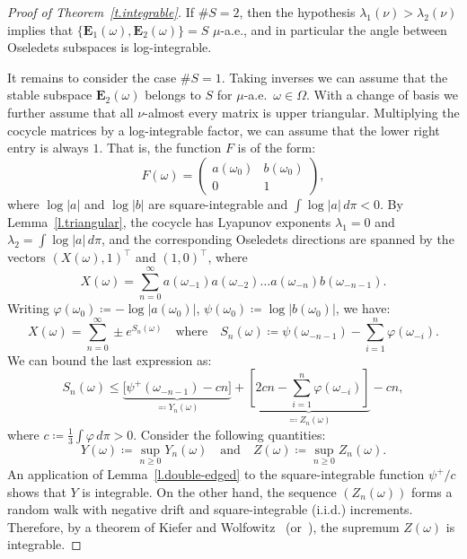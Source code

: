 \documentclass[10pt]{amsart}
\theoremstyle{definition}\newtheorem{defi}[theo]{Definition}\newtheorem{rema}[theo]{Remark}\newtheorem{exam}[theo]{Example}\newtheorem{exem}[theo]{Example}\newtheorem{nota}[theo]{Notation}
\newcommand{\smallplus}{+}\newcommand{\smallminus}{-}\newcommand{\smalltimes}{\times}\newcommand{\smallpm}{\pm}\newcommand{\smallmp}{\mp}
\newcommand{\E}{\mathbf{E}}
\renewcommand{\phi}{\varphi}
\begin{document}
\begin{proof}[Proof of Theorem~\ref{t.integrable}]
If $\# S = 2$, then the hypothesis $\lambda_1(\nu) > \lambda_2(\nu)$ implies that $\{ \E_1(\omega), \E_2(\omega)\} = S$ $\mu$-a.e., and in particular the angle between Oseledets subspaces is log-integrable.

It remains to consider the case $\# S = 1$. Taking inverses we can assume that the stable subspace $\E_2(\omega)$ belongs to $S$ for $\mu$-a.e.~$\omega \in \Omega$. With a change of basis we further assume that all $\nu$-almost every matrix is upper triangular. Multiplying the cocycle matrices by a log-integrable factor, we can assume that the lower right entry is always $1$. That is, the function $F$ is of the form:
\begin{equation}
F(\omega) =
\begin{pmatrix}
a(\omega_0) & b(\omega_0) \\ 0 & 1
\end{pmatrix} ,
\end{equation}
where $\log|a|$ and $\log|b|$ are square-integrable and $\int \log |a| \, d\pi < 0$. By Lemma~\ref{l.triangular}, the cocycle has Lyapunov exponents $\lambda_1 = 0$ and $\lambda_2 = \int \log |a| \, d\pi$, and the corresponding Oseledets directions are spanned by the vectors $(X(\omega),1)^\top$ and $(1,0)^\top$, where
\begin{equation}
X(\omega) = \sum_{n=0}^\infty a(\omega_{-1}) a(\omega_{-2}) \dots a(\omega_{-n}) b(\omega_{-n-1}).
\end{equation}
Writing $\phi(\omega_0) \coloneqq - \log |a(\omega_0)|$, $\psi(\omega_0) \coloneqq \log |b(\omega_0)|$, we have:
\begin{equation}
X(\omega) = \sum_{n=0}^\infty \pm e^{S_n(\omega)} \quad \text{where} \quad S_n(\omega) \coloneqq \psi(\omega_{-n-1}) - \sum_{i=1}^n \phi(\omega_{-i}).
\end{equation}
We can bound the last expression as:
\begin{equation}
S_n(\omega) \le
\underbrace{\Big[\psi^{\smallplus}(\omega_{-n-1}) -cn \Big]}_{\eqcolon Y_n(\omega)} +
\underbrace{\left[2cn - {\sum_{i=1}^n \phi(\omega_{-i}) } \right]}_{\eqcolon Z_n(\omega)} -cn,
\end{equation}
where $c \coloneqq \frac{1}{3} \int \phi \, d\pi > 0$. Consider the following quantities:
\begin{equation}
Y(\omega) \coloneqq \sup_{n \ge 0} Y_n(\omega) \quad \text{and} \quad Z(\omega) \coloneqq \sup_{n \ge 0} Z_n(\omega).
\end{equation}
An application of Lemma~\ref{l.double-edged} to the square-integrable function $\psi^{\smallplus}/c$ shows that $Y$ is integrable. On the other hand, the sequence $(Z_n(\omega))$ forms a random walk with negative drift and square-integrable (i.i.d.) increments. Therefore, by a theorem of Kiefer and Wolfowitz~\cite[Theorem~5]{KieferWolfowitz} (or~\cite[Corollary~3, p.~397]{Chow}), the supremum $Z(\omega)$ is integrable.


\end{proof}
\end{document}
